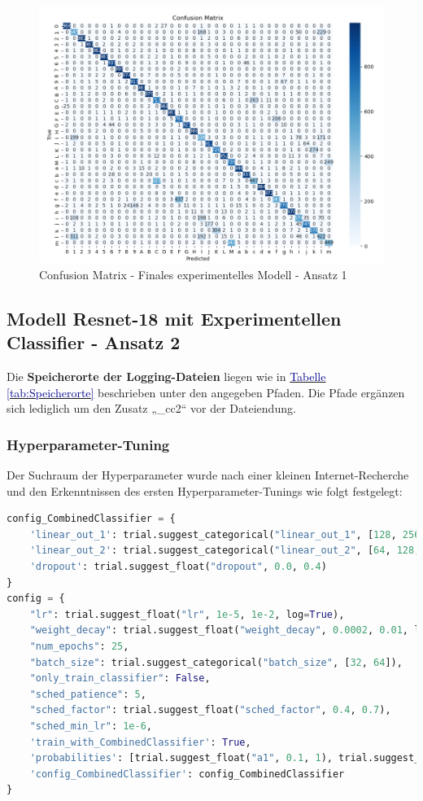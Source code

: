 \documentclass[12pt,oneside]{article}
\begin{document}
  	
  \begin{figure}[h!]
  	\centering
  	\includegraphics[width=0.8\linewidth]{Bilder/ConfusionMatrix/TrainTestFinal_cc}
  	\caption[Confusion Matrix des finalen experimentellen Modells - Ansatz 1]{Confusion Matrix - Finales experimentelles Modell - Ansatz 1}
  	\label{fig:ConfusionMatrixTrainTestFinalcc}
  \end{figure}
  
  
  \subsection{Modell Resnet-18 mit Experimentellen Classifier - Ansatz 2}
		Die \textbf{Speicherorte der Logging-Dateien} liegen wie in \hyperref[tab:Speicherorte]{\textcolor{darkblue}{Tabelle \ref*{tab:Speicherorte}}} beschrieben unter den angegeben Pfaden. Die Pfade ergänzen sich lediglich um den Zusatz „\_cc2“ vor der Dateiendung.
		
		
		\subsubsection{Hyperparameter-Tuning}
			Der Suchraum der Hyperparameter wurde nach einer kleinen Internet-Recherche und den Erkenntnissen des ersten Hyperparameter-Tunings wie folgt festgelegt:
\begin{lstlisting}[language=Python, basicstyle=\small\ttfamily]
config_CombinedClassifier = {
	'linear_out_1': trial.suggest_categorical("linear_out_1", [128, 256, 512]),
	'linear_out_2': trial.suggest_categorical("linear_out_2", [64, 128, 256]),
	'dropout': trial.suggest_float("dropout", 0.0, 0.4)
}
config = {
	"lr": trial.suggest_float("lr", 1e-5, 1e-2, log=True),
	"weight_decay": trial.suggest_float("weight_decay", 0.0002, 0.01, log=True),
	"num_epochs": 25,
	"batch_size": trial.suggest_categorical("batch_size", [32, 64]),
	"only_train_classifier": False,
	"sched_patience": 5,
	"sched_factor": trial.suggest_float("sched_factor", 0.4, 0.7),
	"sched_min_lr": 1e-6,
	'train_with_CombinedClassifier': True,
	'probabilities': [trial.suggest_float("a1", 0.1, 1), trial.suggest_float("a2", 0.1, 1),trial.suggest_float("a3", 0.1, 1)],
	'config_CombinedClassifier': config_CombinedClassifier
}
\end{lstlisting}
			  
\end{document}
